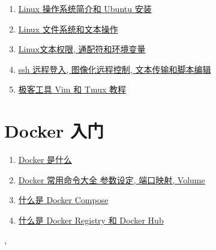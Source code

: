 \documentclass[11pt]{article}
\renewcommand{\today}{\shortmonthname[\the\month] \the \day,  \the\year}
\begin{document}
\begin{enumerate}
	\item \href{https://mp.weixin.qq.com/s/1Dq6-LhbW_YEejS1rG0ePw}{Linux 操作系统简介和 Ubuntu 安装} %
	\item \href{https://mp.weixin.qq.com/s/ENf2ox0N5Bsyoh7fDlSlPA}{Linux 文件系统和文本操作} %
	\item \href{https://mp.weixin.qq.com/s/PBy36Av8DL3SGEo81dJ_Uw}{Linux文本权限, 通配符和环境变量} %
	\item \href{https://mp.weixin.qq.com/s/2lY2HWh1lF693va-MPHrZg}{ssh 远程登入, 图像化远程控制, 文本传输和脚本编辑} %
	\item \href{https://mp.weixin.qq.com/s/qttNYbjj4tFwWEaXMflxsA}{极客工具 Vim 和 Tmux 教程} %
\end{enumerate}

\vspace{0.5cm}

\section{\kaishu Docker 入门}

\begin{enumerate}
	\item \href{https://mp.weixin.qq.com/s/CdeE-5IU9-g0G-Kx0Uyp_A}{Docker 是什么} %
	\item \href{https://mp.weixin.qq.com/s/ocnwfIgedtaWsPdL3NHgIQ}{Docker 常用命令大全 参数设定, 端口映射, Volume} %
	\item \href{https://mp.weixin.qq.com/s/WlbSmc7oipgcO-Vx6FXaVQ}{什么是 Docker Compose} %
	\item \href{https://mp.weixin.qq.com/s/z7EFzjrAeBCPCpaRlFYJwA}{什么是 Docker Registry 和 Docker Hub} %
\end{enumerate}



%
\begin{flushright}
	\tiny \today 
\end{flushright}
\end{document}
